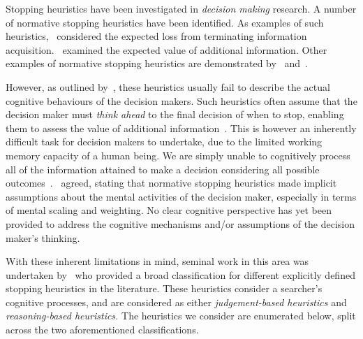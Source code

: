 Stopping heuristics have been investigated in \emph{decision making} research. A number of normative stopping heuristics have been identified. As examples of such heuristics,~\cite{busemeyer1988deferred_decision_making} considered the expected loss from terminating information acquisition.~\cite{kogut1990sunk_costs} examined the expected value of additional information. Other examples of normative stopping heuristics are demonstrated by~\cite{pitz1969information_seeking} and~\cite{busemeyer1988deferred_decision_making}.

However, as outlined by~\cite{browne2004stopping_rules}, these heuristics usually fail to describe the actual cognitive behaviours of the decision makers. Such heuristics often assume that the decision maker must \emph{think ahead} to the final decision of when to stop, enabling them to assess the value of additional information~\citep{busemeyer1988deferred_decision_making}. This is however an inherently difficult task for decision makers to undertake, due to the limited working memory capacity of a human being. We are simply unable to cognitively process all of the information attained to make a decision considering all possible outcomes~\citep{browne2004stopping_rules}.~\cite{nickles1995judgment} agreed, stating that normative stopping heuristics made implicit assumptions about the mental activities of the decision maker, especially in terms of mental scaling and weighting. No clear cognitive perspective has yet been provided to address the cognitive mechanisms and/or assumptions of the decision maker's thinking.

With these inherent limitations in mind, seminal work in this area was undertaken by~\cite{nickles1995judgment} who provided a broad classification for different explicitly defined stopping heuristics in the literature. These heuristics consider a searcher's cognitive processes, and are considered as either \emph{judgement-based heuristics} and \emph{reasoning-based heuristics.} The heuristics we consider are enumerated below, split across the two aforementioned classifications.


